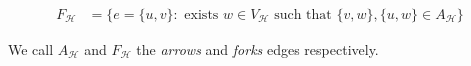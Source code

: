 \begin{definition}
\begin{enumerate}
        \begin{equation*}
          \begin{split}
            F_{\mathcal{H}} &= \big\{ e = \{u,v\} : \text{ exists } w \in V_{\mathcal{H}} \text{ such that } \{v,w\},\{u,w\} \in A_{\mathcal{H}} \big\} 
          \end{split}
        \end{equation*}
    \end{enumerate}
    We call $A_{\mathcal{H}}$ and $F_{\mathcal{H}}$ the \textit{arrows} and \textit{forks} edges respectively. 
\end{definition}





